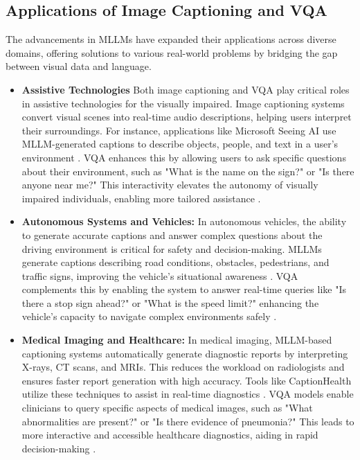 \subsection{Applications of Image Captioning and VQA}

The advancements in MLLMs have expanded their applications across diverse domains, offering solutions to various real-world problems by bridging the gap between visual data and language.

\begin{itemize}
    \item \textbf{Assistive Technologies} Both image captioning and VQA play critical roles in assistive technologies for the visually impaired. Image captioning systems convert visual scenes into real-time audio descriptions, helping users interpret their surroundings. For instance, applications like Microsoft Seeing AI use MLLM-generated captions to describe objects, people, and text in a user's environment \cite{icmeta2021assistive}. VQA enhances this by allowing users to ask specific questions about their environment, such as "What is the name on the sign?" or "Is there anyone near me?" This interactivity elevates the autonomy of visually impaired individuals, enabling more tailored assistance \cite{assistive_vqa2020}.
    \item \textbf{Autonomous Systems and Vehicles:} In autonomous vehicles, the ability to generate accurate captions and answer complex questions about the driving environment is critical for safety and decision-making. MLLMs generate captions describing road conditions, obstacles, pedestrians, and traffic signs, improving the vehicle's situational awareness \cite{icmeta2020autonomous}. VQA complements this by enabling the system to answer real-time queries like "Is there a stop sign ahead?" or "What is the speed limit?" enhancing the vehicle's capacity to navigate complex environments safely \cite{autonomous_vqa2019}.
    
    \item \textbf{Medical Imaging and Healthcare:} In medical imaging, MLLM-based captioning systems automatically generate diagnostic reports by interpreting X-rays, CT scans, and MRIs. This reduces the workload on radiologists and ensures faster report generation with high accuracy. Tools like CaptionHealth utilize these techniques to assist in real-time diagnostics \cite{icmeta2021medical}. VQA models enable clinicians to query specific aspects of medical images, such as "What abnormalities are present?" or "Is there evidence of pneumonia?" This leads to more interactive and accessible healthcare diagnostics, aiding in rapid decision-making \cite{med_vqa2019, healthcare_vqa2021}.
    

\end{itemize}
